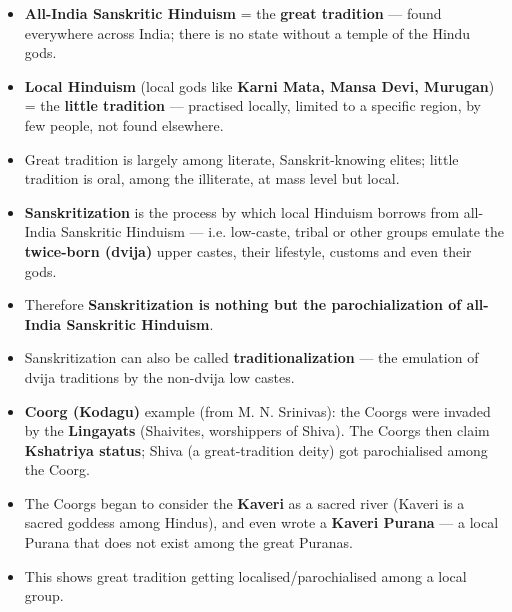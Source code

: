\begin{ComparisonBox}
\begin{itemize}
\item \textbf{All-India Sanskritic Hinduism} = the \textbf{great tradition} --- found everywhere across India; there is no state without a temple of the Hindu gods.
\item \textbf{Local Hinduism} (local gods like \textbf{Karni Mata, Mansa Devi, Murugan}) = the \textbf{little tradition} --- practised locally, limited to a specific region, by few people, not found elsewhere.
\item Great tradition is largely among literate, Sanskrit-knowing elites; little tradition is oral, among the illiterate, at mass level but local.
\end{itemize}
\end{ComparisonBox}

\begin{KeyConcept}
\begin{itemize}
\item \textbf{Sanskritization} is the process by which local Hinduism borrows from all-India Sanskritic Hinduism --- i.e. low-caste, tribal or other groups emulate the \textbf{twice-born (dvija)} upper castes, their lifestyle, customs and even their gods.
\item Therefore \textbf{Sanskritization is nothing but the parochialization of all-India Sanskritic Hinduism}.
\item Sanskritization can also be called \textbf{traditionalization} --- the emulation of dvija traditions by the non-dvija low castes.
\end{itemize}
\end{KeyConcept}

\begin{ExampleBox}
\begin{itemize}
\item \textbf{Coorg (Kodagu)} example (from M. N. Srinivas): the Coorgs were invaded by the \textbf{Lingayats} (Shaivites, worshippers of Shiva). The Coorgs then claim \textbf{Kshatriya status}; Shiva (a great-tradition deity) got parochialised among the Coorg.
\item The Coorgs began to consider the \textbf{Kaveri} as a sacred river (Kaveri is a sacred goddess among Hindus), and even wrote a \textbf{Kaveri Purana} --- a local Purana that does not exist among the great Puranas.
\item This shows great tradition getting localised/parochialised among a local group.
\end{itemize}
\end{ExampleBox}

